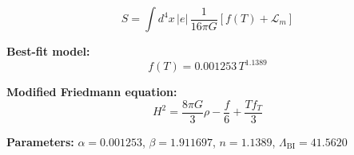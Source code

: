 
\begin{equation}
  S = \int d^4x \, |e| \, \frac{1}{16\pi G} \left[ f(T) + \mathcal{L}_m \right]
\end{equation}

\textbf{Best-fit model:}
\begin{equation}
  f(T) = 0.001253 \, T^{1.1389}
\end{equation}

\textbf{Modified Friedmann equation:}
\begin{equation}
  H^2 = \frac{8\pi G}{3} \rho - \frac{f}{6} + \frac{T f_T}{3}
\end{equation}

\textbf{Parameters:}
$\alpha = 0.001253$, \quad
$\beta = 1.911697$, \quad
$n = 1.1389$, \quad
$\Lambda_{\text{BI}} = 41.5620$